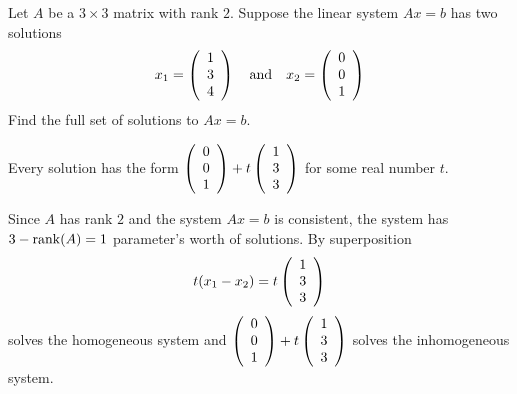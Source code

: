\documentclass{ximera}
\author{Marty Golubitsky}
\begin{document}
\begin{exercise}\label{A.3.4.2}

Let $A$ be a $3\times 3$ matrix with rank $2$.  Suppose the linear system $Ax=b$ has two solutions
\[
x_1 = \left(\begin{array}{rrrrrrrrrrrrrrrrrr} 1 \\3 \\4 \end{array}\right) \quad\mbox{and}\quad x_2 = \left(\begin{array}{rrrrrrrrrrrrrrrrrr} 0\\ 0 \\ 1 \end{array}\right)
\]
Find the full set of solutions to $Ax = b$. 
  
\begin{solution}

\ans Every solution has the form $\left(\begin{array}{rrrrrrrrrrrrrrrrrr} 0\\0\\1 \end{array}\right) + t \left(\begin{array}{rrrrrrrrrrrrrrrrrr} 1\\3\\3 \end{array}\right)$ for some real number $t$. 

\soln Since $A$ has rank $2$ and the system $Ax=b$ is consistent, the system has $3 -{\rm rank}(A) = 1$ parameter's worth of solutions.  By superposition 
\[
t(x_1 - x_ 2) = t \left(\begin{array}{rrrrrrrrrrrrrrrrrr} 1\\3\\3 \end{array}\right)
\]
solves the homogeneous system and $\left(\begin{array}{rrrrrrrrrrrrrrrrrr} 0\\0\\1 \end{array}\right) + t \left(\begin{array}{rrrrrrrrrrrrrrrrrr} 1\\3\\3 \end{array}\right)$ solves the inhomogeneous system.

\end{solution}
\end{exercise}
\end{document}
